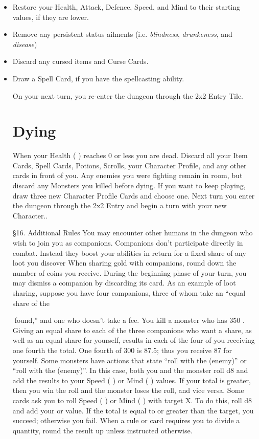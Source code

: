 \documentclass{book}
\begin{document}
\begin{itemize}
\item Restore your Health, Attack, Defence, Speed, and Mind to their starting values, if they
are lower.
\item Remove any persistent status ailments (i.e. \emph{blindness}, \emph{drunkeness}, and \emph{disease})
\item Discard any cursed items and Curse Cards.
\item Draw a Spell Card, if you have the spellcasting ability.

On your next turn, you re-enter the dungeon through the 2x2 Entry Tile.

\section{Dying} \label{dying}
When your Health ( ) reaches 0 or less you are dead. Discard all your Item Cards, Spell Cards, Potions, Scrolls,
your Character Profile, and any other cards in front of you. Any enemies you were fighting remain in room, but
discard any Monsters you killed before dying. If you want to keep playing, draw three new Character Profile
Cards and choose one. Next turn you enter the dungeon through the 2x2 Entry and begin a turn with your new
Character..

§16. Additional Rules
You may encounter other humans in the dungeon who wish to join you as companions. Companions don’t
participate directly in combat. Instead they boost your abilities in return for a fixed share of any loot you discover
When sharing gold with companions, round down the number of coins you receive. During the beginning phase
of your turn, you may dismiss a companion by discarding its card.
As an example of loot sharing, suppose you have four companions, three of whom take an “equal share of the

found,” and one who doesn’t take a fee. You kill a monster who has 350 . Giving an equal share to each of the
three companions who want a share, as well as an equal share for yourself, results in each of the four of you
receiving one fourth the total. One fourth of 300 is 87.5; thus you receive 87 for yourself.
Some monsters have actions that state “roll with the (enemy)” or “roll with the (enemy)”. In this case, both
you and the monster roll d8 and add the results to your Speed ( ) or Mind ( ) values. If your total is greater, then
you win the roll and the monster loses the roll, and vice versa.
Some cards ask you to roll Speed ( ) or Mind ( ) with target X. To do this, roll d8 and add your or value. If
the total is equal to or greater than the target, you succeed; otherwise you fail.
When a rule or card requires you to divide a quantity, round the result up unless instructed otherwise.


\end{itemize}
\end{document}
